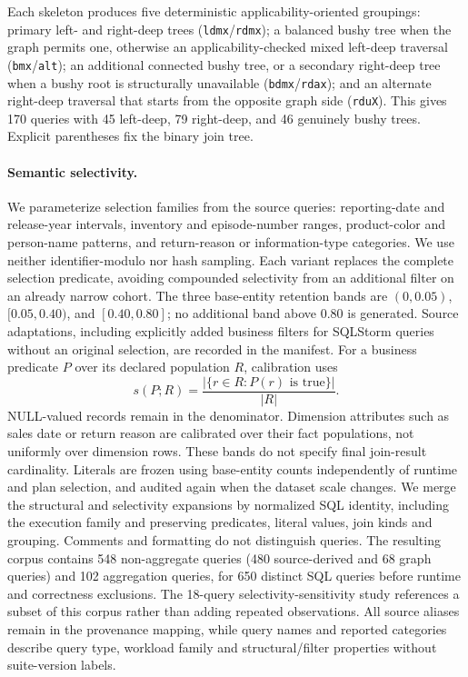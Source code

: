 Each skeleton produces five deterministic applicability-oriented groupings:
primary left- and right-deep trees (\texttt{ldmx}/\texttt{rdmx}); a balanced
bushy tree when the graph permits one, otherwise an applicability-checked mixed
left-deep traversal (\texttt{bmx}/\texttt{alt}); an additional connected bushy
tree, or a secondary right-deep tree when a bushy root is structurally
unavailable (\texttt{bdmx}/\texttt{rdax}); and an alternate right-deep traversal
that starts from the opposite graph side (\texttt{rduX}). This gives 170 queries
with 45 left-deep, 79 right-deep, and 46 genuinely bushy trees. Explicit
parentheses fix the binary join tree.

\paragraph{Semantic selectivity.}
We parameterize selection families from the source queries: reporting-date and
release-year intervals, inventory and episode-number ranges, product-color and
person-name patterns, and return-reason or information-type categories. We use
neither identifier-modulo nor hash sampling. Each variant replaces the complete
selection predicate, avoiding compounded selectivity from an additional filter
on an already narrow cohort. The three base-entity retention bands are
$(0,0.05)$, $[0.05,0.40)$, and $[0.40,0.80]$; no additional band above $0.80$
is generated. Source adaptations, including explicitly added business filters
for SQLStorm queries without an original selection, are recorded in the manifest.
For a business predicate $P$ over its declared population $R$, calibration uses
\[
  s(P;R)=\frac{|\{r\in R : P(r)\text{ is true}\}|}{|R|}.
\]
NULL-valued records remain in the denominator. Dimension attributes such as
sales date or return reason are calibrated over their fact populations, not
uniformly over dimension rows. These bands do not specify final join-result
cardinality. Literals are frozen using base-entity counts independently of
runtime and plan selection, and audited again when the dataset scale changes.
We merge the structural and selectivity expansions by normalized SQL identity,
including the execution family and preserving predicates, literal values, join
kinds and grouping. Comments and formatting do not distinguish queries. The
resulting corpus contains 548 non-aggregate queries (480 source-derived and 68
graph queries) and 102 aggregation queries, for 650 distinct SQL queries before
runtime and correctness exclusions. The 18-query selectivity-sensitivity study
references a subset of this corpus rather than adding repeated observations.
All source aliases remain in the provenance mapping, while query names and
reported categories describe query type, workload family and structural/filter
properties without suite-version labels.

